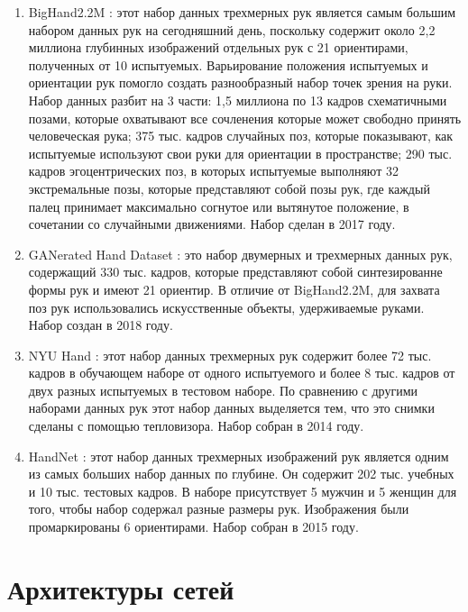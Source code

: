 \begin{enumerate}[label=\arabic*)]
	
	\item BigHand2.2M \cite{BigHand2.2M}: этот набор данных трехмерных рук является самым большим набором данных рук на сегодняшний день, поскольку содержит около 2,2 миллиона глубинных изображений отдельных рук с 21 ориентирами, полученных от 10 испытуемых.
	Варьирование положения испытуемых и ориентации рук помогло создать разнообразный набор точек зрения на руки.
	Набор данных разбит на 3 части: 1,5 миллиона по 13 кадров схематичными позами, которые охватывают все сочленения которые может свободно принять человеческая рука; 375 тыс. кадров случайных поз, которые показывают, как испытуемые используют свои руки для ориентации в пространстве; 290 тыс. кадров эгоцентрических поз, в которых испытуемые выполняют 32 экстремальные позы, которые представляют собой позы рук, где каждый палец принимает максимально согнутое или вытянутое положение, в сочетании со случайными движениями.
	Набор сделан в 2017 году.
	
	\item GANerated Hand Dataset \cite{GANeratedHands_CVPR2018}: это набор двумерных и трехмерных данных рук, содержащий 330 тыс. кадров, которые представляют собой синтезированне формы рук и имеют 21 ориентир.
	В отличие от BigHand2.2M, для захвата поз рук использовались искусственные объекты, удерживаемые руками.
	Набор создан в 2018 году. 
	
	\item NYU Hand \cite{tompson14tog}: этот набор данных трехмерных рук содержит более 72 тыс. кадров в обучающем наборе от одного испытуемого и более 8 тыс. кадров от двух разных испытуемых в тестовом наборе.
	По сравнению с другими наборами данных рук этот набор данных выделяется тем, что это снимки сделаны с помощью тепловизора. 
	Набор собран в 2014 году.
	
	\item HandNet \cite{WetzlerBMVC15}: этот набор данных трехмерных изображений рук является одним из самых больших набор данных по глубине.
	Он содержит 202 тыс. учебных и 10 тыс. тестовых кадров.
	В наборе присутствует 5 мужчин и 5 женщин для того, чтобы набор содержал разные размеры рук.
	Изображения были промаркированы 6 ориентирами.
	Набор собран в 2015 году.
	
	
\end{enumerate}

\section{Архитектуры сетей}

